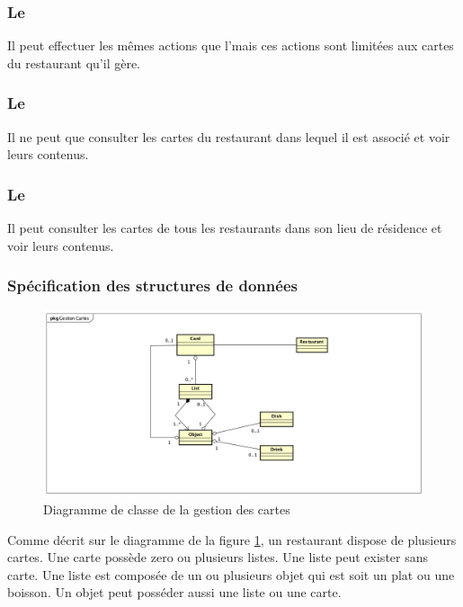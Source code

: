 \subsubsection*{Le \m}
Il peut effectuer les mêmes actions que l'\adm mais ces actions sont limitées aux cartes du restaurant qu'il gère.

\subsubsection*{Le \sev}
Il ne peut que consulter les cartes du restaurant dans lequel il est associé et voir leurs contenus.

\subsubsection*{Le \cl}
Il peut consulter les cartes de tous les restaurants dans son lieu de résidence et voir leurs contenus.

\subsubsection{Spécification des structures de données}
\begin{figure}[H]
	\centering
	\includegraphics[scale=0.4]{assets/images/gestion_card_cd.png}
	\caption{Diagramme de classe de la gestion des cartes}
	\label{fig.11}
\end{figure}

Comme décrit sur le diagramme de la figure \ref{fig.11}, un restaurant dispose de plusieurs cartes. Une carte possède zero ou plusieurs listes. Une liste peut exister sans carte. Une liste est composée de un ou plusieurs objet qui est soit un plat ou une boisson. Un objet peut posséder aussi une liste ou une carte.


